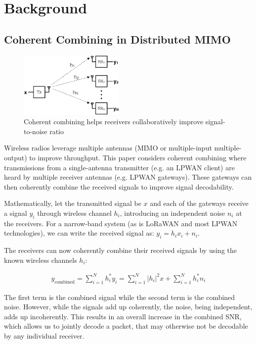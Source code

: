 \section{Background}
\label{sec:background}

\subsection{Coherent Combining in Distributed MIMO}
\label{sec:simo}

\begin{figure}[!bht]
    \centering
    \includegraphics[height=1.25in]{figures/SIMO_cropped}
    \vspace{-10pt}
    \caption{Coherent combining helps receivers collaboratively improve
        signal-to-noise ratio}
    \label{fig:simo}
    \compactimg
\end{figure}

Wireless radios leverage multiple antennas (MIMO or multiple-input
multiple-output) to improve throughput. This paper considers coherent
combining where transmissions from a single-antenna transmitter (e.g. an
LPWAN client) are heard by multiple receiver antennas (e.g. LPWAN gateways).
These gateways can then coherently combine the received signals to improve
signal decodability.

Mathematically, let the transmitted signal be $x$ and each of the gateways
receive a signal $y_i$ through wireless channel $h_i$, introducing an
independent noise $n_i$ at the receivers. For a narrow-band system (as is
LoRaWAN and most LPWAN technologies), we can write the received signal as:
$y_i = h_i x_i + n_i $.

The receivers can now coherently combine their received signals by using the
known wireless channels $h_i$:

\compactimg

\begin{align*}
y_{\text{combined}}
	= \sum_{i=1}^N h^*_i y_i
	= \sum_{i=1}^N \left| h_i \right|^2 x + \sum_{i=1}^N h^*_i n_i
\end{align*}

The first term is the combined signal while the second term is the combined
noise. However, while the signals add up coherently, the noise, being
independent, adds up incoherently. This results in an overall increase in the
combined SNR, which allows us to jointly decode a packet, that may otherwise
not be decodable by any individual receiver.

